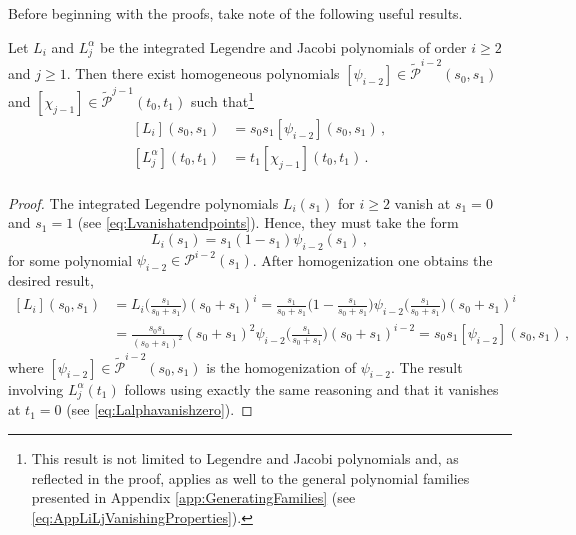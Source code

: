 Before beginning with the proofs, take note of the following useful results.
\begin{lemma}
\label{lem:LegendreDecomp}
Let $L_i$ and $L_j^\alpha$ be the integrated Legendre and Jacobi polynomials of order $i\geq2$ and $j\geq1$.
Then there exist homogeneous polynomials $[\psi_{i-2}]\in\tilde{\mathcal{P}}^{i-2}(s_0,s_1)$ and $[\chi_{j-1}]\in\tilde{\mathcal{P}}^{j-1}(t_0,t_1)$ such that\footnote{This result is not limited to Legendre and Jacobi polynomials and, as reflected in the proof, applies as well to the general polynomial families presented in Appendix \ref{app:GeneratingFamilies} (see \eqref{eq:AppLiLjVanishingProperties}).}
\begin{equation}
	\begin{aligned}
		{}[L_i](s_0,s_1)&=s_0s_1[\psi_{i-2}](s_0,s_1)\,,\\
		[L_j^\alpha](t_0,t_1)&=t_1[\chi_{j-1}](t_0,t_1)\,.\\
	\end{aligned}	
\end{equation}
\end{lemma} 
\begin{proof}
The integrated Legendre polynomials $L_i(s_1)$ for $i\geq2$ vanish at $s_1=0$ and $s_1=1$ (see \eqref{eq:Lvanishatendpoints}).
Hence, they must take the form
\begin{equation*}
	L_i(s_1)=s_1(1-s_1)\psi_{i-2}(s_1)\,,
\end{equation*}
for some polynomial $\psi_{i-2}\in\mathcal{P}^{i-2}(s_1)$.
After homogenization one obtains the desired result,
\begin{equation*}
\begin{aligned}
	{}[L_i](s_0,s_1)&=L_i\Big(\frac{s_1}{s_0+s_1}\Big)(s_0+s_1)^{i}
		=\frac{s_1}{s_0+s_1}\Big(1-\frac{s_1}{s_0+s_1}\Big)\psi_{i-2}\Big(\frac{s_1}{s_0+s_1}\Big)(s_0+s_1)^i\\
	&=\frac{s_0s_1}{(s_0+s_1)^2}(s_0+s_1)^2\psi_{i-2}\Big(\frac{s_1}{s_0+s_1}\Big)(s_0+s_1)^{i-2}
			=s_0s_1[\psi_{i-2}](s_0,s_1)\,,
\end{aligned}
\end{equation*}
where $[\psi_{i-2}]\in\tilde{\mathcal{P}}^{i-2}(s_0,s_1)$ is the homogenization of $\psi_{i-2}$.
The result involving $L_j^\alpha(t_1)$ follows using exactly the same reasoning and that it vanishes at $t_1=0$ (see \eqref{eq:Lalphavanishzero}). 
\end{proof}


